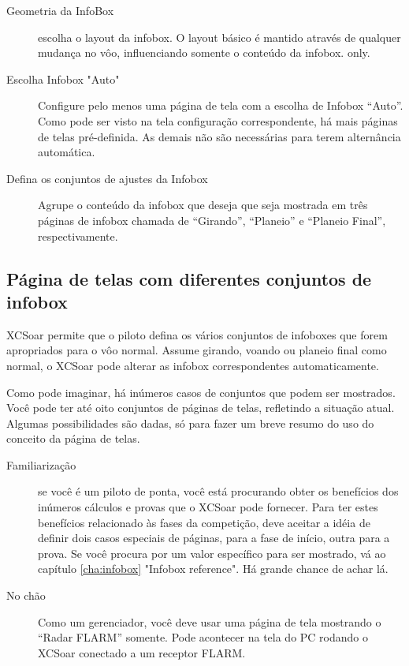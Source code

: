 \begin{description}
\item[Geometria da InfoBox] escolha o layout da infobox.  O layout básico é mantido através de qualquer mudança no vôo, influenciando somente o conteúdo da infobox.
only.
\item[Escolha Infobox "Auto"] Configure pelo menos uma página de tela com a escolha de Infobox “Auto”.  Como pode ser visto na tela configuração correspondente, há mais páginas de telas pré-definida.  As demais não são necessárias para terem alternância automática. 
\item[Defina os conjuntos de ajustes da Infobox] Agrupe o conteúdo da infobox que deseja que seja mostrada em três páginas de infobox chamada de “Girando”, “Planeio” e “Planeio Final”, respectivamente.
\end{description}
 

 
\subsection*{Página de telas com diferentes conjuntos de infobox}\label{sec:screenpages}

XCSoar permite que o piloto defina os vários conjuntos de infoboxes que forem apropriados para o vôo normal.  Assume girando, voando ou planeio final como normal, o XCSoar pode alterar as infobox correspondentes automaticamente.

Como pode imaginar, há inúmeros casos de conjuntos que podem ser mostrados.  Você pode ter até oito conjuntos de páginas de telas, refletindo a situação atual.  Algumas possibilidades são dadas, só para fazer um breve resumo do uso do conceito da página de telas.

\label{par:use_case}
\begin{description}
\item[Familiarização] se você é um piloto de ponta, você está procurando obter os benefícios dos inúmeros cálculos e provas que o XCSoar pode fornecer.  Para ter estes benefícios relacionado às fases da competição, deve aceitar a idéia de definir dois casos especiais de páginas, para a fase de início, outra para a prova.  Se você procura por um valor específico para ser mostrado, vá ao capítulo  \ref{cha:infobox} "Infobox reference". 
Há grande chance de achar lá.
\item[No chão] Como um gerenciador, você deve usar uma página de tela mostrando o “Radar FLARM” somente.  Pode acontecer na tela do PC rodando o XCSoar conectado a um receptor FLARM.
\end{description}

